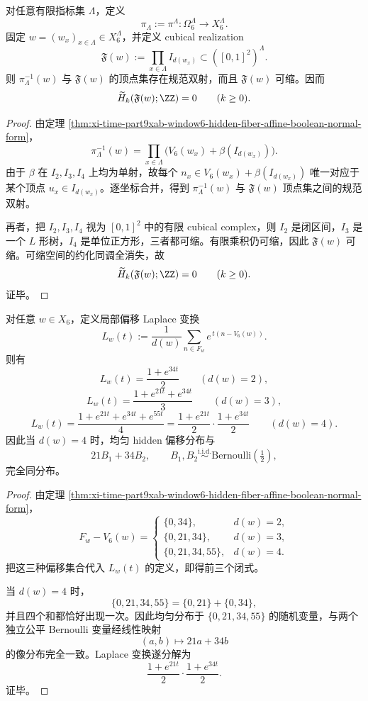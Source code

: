 \begin{corollary}\label{cor:xi-time-part9xab-window6-hidden-fiber-global-contractibility}
对任意有限指标集 \(\Lambda\)，定义
\[
\pi_\Lambda:=\pi^\Lambda:\Omega_6^\Lambda\to X_6^\Lambda.
\]
固定 \(w=(w_x)_{x\in\Lambda}\in X_6^\Lambda\)，并定义 cubical realization
\[
\mathfrak F(w):=\prod_{x\in\Lambda} I_{d(w_x)}
\subset ([0,1]^2)^\Lambda.
\]
则 \(\pi_\Lambda^{-1}(w)\) 与 \(\mathfrak F(w)\) 的顶点集存在规范双射，而且 \(\mathfrak F(w)\) 可缩。因而
\[
\widetilde H_k(\mathfrak F(w);\ZZ)=0
\qquad (k\ge 0).
\]
\end{corollary}
\begin{proof}
由定理 \ref{thm:xi-time-part9xab-window6-hidden-fiber-affine-boolean-normal-form}，
\[
\pi_\Lambda^{-1}(w)
=
\prod_{x\in\Lambda}\bigl(V_6(w_x)+\beta(I_{d(w_x)})\bigr).
\]
由于 \(\beta\) 在 \(I_2,I_3,I_4\) 上均为单射，故每个 \(n_x\in V_6(w_x)+\beta(I_{d(w_x)})\) 唯一对应于某个顶点 \(u_x\in I_{d(w_x)}\)。逐坐标合并，得到 \(\pi_\Lambda^{-1}(w)\) 与 \(\mathfrak F(w)\) 顶点集之间的规范双射。

再者，把 \(I_2,I_3,I_4\) 视为 \([0,1]^2\) 中的有限 cubical complex，则 \(I_2\) 是闭区间，\(I_3\) 是一个 \(L\) 形树，\(I_4\) 是单位正方形，三者都可缩。有限乘积仍可缩，因此 \(\mathfrak F(w)\) 可缩。可缩空间的约化同调全消失，故
\[
\widetilde H_k(\mathfrak F(w);\ZZ)=0
\qquad (k\ge 0).
\]
证毕。
\end{proof}

\begin{theorem}\label{thm:xi-time-part9xab-window6-fourpoint-fiber-ranktwo-bernoulli-factorization}
对任意 \(w\in X_6\)，定义局部偏移 Laplace 变换
\[
L_w(t):=\frac1{d(w)}
\sum_{n\in F_w} e^{\,t(n-V_6(w))}.
\]
则有
\[
L_w(t)=\frac{1+e^{34t}}{2}
\qquad (d(w)=2),
\]
\[
L_w(t)=\frac{1+e^{21t}+e^{34t}}{3}
\qquad (d(w)=3),
\]
\[
L_w(t)=\frac{1+e^{21t}+e^{34t}+e^{55t}}{4}
=
\frac{1+e^{21t}}2\cdot \frac{1+e^{34t}}2
\qquad (d(w)=4).
\]
因此当 \(d(w)=4\) 时，均匀 hidden 偏移分布与
\[
21B_1+34B_2,
\qquad
B_1,B_2\stackrel{\mathrm{i.i.d.}}{\sim}\mathrm{Bernoulli}\!\left(\tfrac12\right),
\]
完全同分布。
\end{theorem}
\begin{proof}
由定理 \ref{thm:xi-time-part9xab-window6-hidden-fiber-affine-boolean-normal-form}，
\[
F_w-V_6(w)=
\begin{cases}
\{0,34\}, & d(w)=2,\\
\{0,21,34\}, & d(w)=3,\\
\{0,21,34,55\}, & d(w)=4.
\end{cases}
\]
把这三种偏移集合代入 \(L_w(t)\) 的定义，即得前三个闭式。

当 \(d(w)=4\) 时，
\[
\{0,21,34,55\}=\{0,21\}+\{0,34\},
\]
并且四个和都恰好出现一次。因此均匀分布于 \(\{0,21,34,55\}\) 的随机变量，与两个独立公平 Bernoulli 变量经线性映射
\[
(a,b)\longmapsto 21a+34b
\]
的像分布完全一致。Laplace 变换遂分解为
\[
\frac{1+e^{21t}}2\cdot \frac{1+e^{34t}}2.
\]
证毕。
\end{proof}

